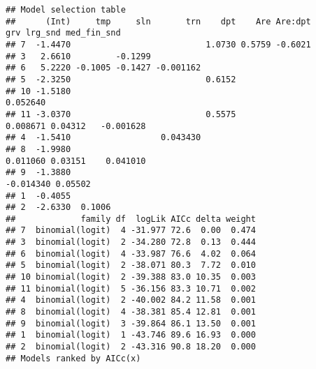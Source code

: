 \documentclass[
]{book}
\newenvironment{Shaded}{\begin{snugshade}}{\end{snugshade}}
\newcommand{\DataTypeTok}[1]{\textcolor[rgb]{0.13,0.29,0.53}{#1}}
\newcommand{\DecValTok}[1]{\textcolor[rgb]{0.00,0.00,0.81}{#1}}
\newcommand{\KeywordTok}[1]{\textcolor[rgb]{0.13,0.29,0.53}{\textbf{#1}}}
\newcommand{\NormalTok}[1]{#1}
\newcommand{\OperatorTok}[1]{\textcolor[rgb]{0.81,0.36,0.00}{\textbf{#1}}}
\newcommand{\StringTok}[1]{\textcolor[rgb]{0.31,0.60,0.02}{#1}}
\begin{document}
\begin{verbatim}
## Model selection table 
##      (Int)     tmp     sln       trn    dpt    Are Are:dpt       grv lrg_snd med_fin_snd
## 7  -1.4470                           1.0730 0.5759 -0.6021                              
## 3   2.6610         -0.1299                                                              
## 6   5.2220 -0.1005 -0.1427 -0.001162                                                    
## 5  -2.3250                           0.6152                                             
## 10 -1.5180                                                                      0.052640
## 11 -3.0370                           0.5575                 0.008671 0.04312   -0.001628
## 4  -1.5410                  0.043430                                                    
## 8  -1.9980                                                  0.011060 0.03151    0.041010
## 9  -1.3880                                                 -0.014340 0.05502            
## 1  -0.4055                                                                              
## 2  -2.6330  0.1006                                                                      
##             family df  logLik AICc delta weight
## 7  binomial(logit)  4 -31.977 72.6  0.00  0.474
## 3  binomial(logit)  2 -34.280 72.8  0.13  0.444
## 6  binomial(logit)  4 -33.987 76.6  4.02  0.064
## 5  binomial(logit)  2 -38.071 80.3  7.72  0.010
## 10 binomial(logit)  2 -39.388 83.0 10.35  0.003
## 11 binomial(logit)  5 -36.156 83.3 10.71  0.002
## 4  binomial(logit)  2 -40.002 84.2 11.58  0.001
## 8  binomial(logit)  4 -38.381 85.4 12.81  0.001
## 9  binomial(logit)  3 -39.864 86.1 13.50  0.001
## 1  binomial(logit)  1 -43.746 89.6 16.93  0.000
## 2  binomial(logit)  2 -43.316 90.8 18.20  0.000
## Models ranked by AICc(x)
\end{verbatim}

\begin{Shaded}
\end{Shaded}
\end{document}
